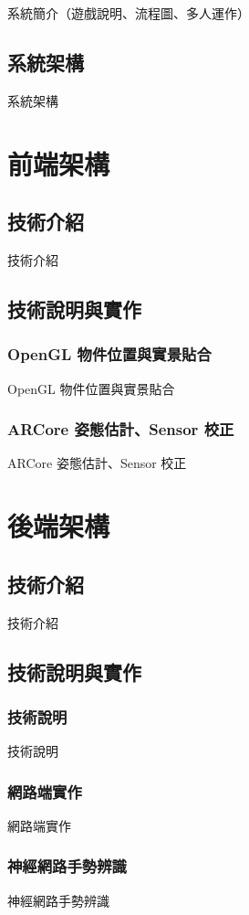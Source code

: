 \documentclass[12pt, a4paper]{report}
\begin{document}
    系統簡介（遊戲說明、流程圖、多人運作）

\section{系統架構}

    系統架構

\chapter{前端架構}
\section{技術介紹}

    技術介紹

\section{技術說明與實作}
\subsection{OpenGL 物件位置與實景貼合}

    OpenGL 物件位置與實景貼合

\subsection{ARCore 姿態估計、Sensor 校正}

    ARCore 姿態估計、Sensor 校正

\chapter{後端架構}
\section{技術介紹}

    技術介紹

\section{技術說明與實作}
\subsection{技術說明}

    技術說明

\subsection{網路端實作}

    網路端實作

\subsection{神經網路手勢辨識}

    神經網路手勢辨識
\end{document}
